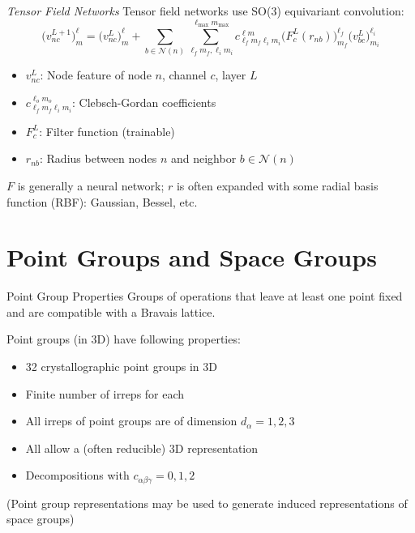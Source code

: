 \documentclass[11pt]{beamer}
\begin{document}
\begin{frame}{\textit{Tensor Field Networks}}
	Tensor field networks \cite{tfn} use SO(3) equivariant convolution:{\small
	$$
	\big(v^{L+1}_{nc}\big) ^{\ell}_{m}=\big(v^{L}_{nc}\big)^{\ell}_m+\sum_{b\in \mathcal{N}(n)}\sum_{\ell_f m_f , \ell_i m_i}^{\ell_{\text{max}} m_{\text{max}}}c_{\ell_fm_f\ell_im_i}^{\ell m}\big(F^{L}_c(r_{nb})\big)^{\ell_f}_{m_f}\big(v_{bc}^L \big)^{\ell_i}_{m_i}
	$$}
	\begin{itemize}
		\item $v_{nc}^{L}$: Node feature of node $n$, channel $c$, layer $L$
		\item $c_{\ell_fm_f\ell_im_i}^{\ell_om_o}$: Clebsch-Gordan coefficients
		\item $F_c^L$: Filter function (trainable)
		\item $r_{nb}$: Radius between nodes $n$ and neighbor $b\in \mathcal{N}(n)$
	\end{itemize}
	
	\vspace{.7cm}
	
	$F$ is generally a neural network; $r$ is often expanded with some radial basis function (RBF): Gaussian, Bessel, etc.
\end{frame}

\section{Point Groups and Space Groups}

\begin{frame}{Point Group Properties}
Groups of operations that leave at least one point fixed and are compatible with a Bravais lattice.

\vspace{0.3cm}
	
Point groups (in 3D) have following properties:
	\begin{itemize}
		\item 32 crystallographic point groups in 3D
		\item Finite number of irreps for each
		\item All irreps of point groups are of dimension $d_{\alpha}=1,2,3$
		\item All allow a (often reducible) 3D representation
		\item Decompositions with $c_{\alpha\beta\gamma}=0,1,2$
	\end{itemize}
	
{\small
(Point group representations may be used to generate induced representations of space groups)}
\end{frame}
\end{document}
